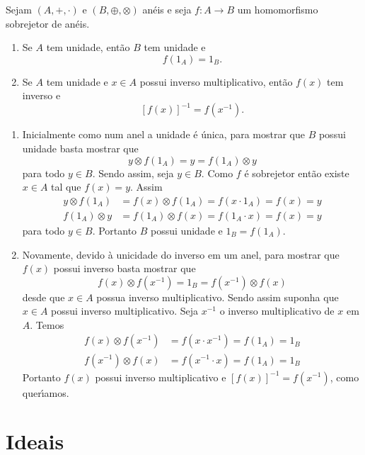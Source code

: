 \begin{proposicao}
	Sejam $(A, +, \cdot)$ e $(B, \oplus, \otimes)$ an\'eis e seja $f : A \to B$ um homomorfismo sobrejetor de an\'eis.
	\begin{enumerate}[label={\roman*})]
		\item Se $A$ tem unidade, ent\~ao $B$ tem unidade e
		\[
			f(1_A) = 1_B.
		\]
		\item Se $A$ tem unidade e $x \in A$ possui inverso multiplicativo, ent\~ao $f(x)$ tem inverso e
		\[
			[f(x)]^{-1} = f(x^{-1}).
		\]
	\end{enumerate}
\end{proposicao}
\begin{prova}
	\begin{enumerate}[label={\roman*})]
		\item Inicialmente como num anel a unidade \'e \'unica, para mostrar que $B$ possui unidade basta mostrar que
		\[
			y\otimes f(1_A) = y = f(1_A)\otimes y
		\]
		para todo $y \in B$. Sendo assim, seja $y \in B$. Como $f$ \'e sobrejetor ent\~ao existe $x \in A$ tal que $f(x) = y$. Assim
		\begin{align*}
			y\otimes f(1_A) &= f(x) \otimes f(1_A) = f(x\cdot 1_A) = f(x) = y\\
			f(1_A)\otimes y &= f(1_A) \otimes f(x) = f(1_A\cdot x) = f(x) = y
		\end{align*}
		para todo $y \in B$. Portanto $B$ possui unidade e $1_B = f(1_A)$.

		\item Novamente, devido \`a unicidade do inverso em um anel, para mostrar que $f(x)$ possui inverso basta mostrar que
		\[
			f(x)\otimes f(x^{-1}) = 1_B = f(x^{-1})\otimes f(x)
		\]
		desde que $x \in A$ possua inverso multiplicativo. Sendo assim suponha que $x \in A$ possui inverso multiplicativo. Seja $x^{-1}$ o inverso multiplicativo de $x$ em $A$. Temos
		\begin{align*}
			f(x)\otimes f(x^{-1}) &= f(x\cdot x^{-1}) = f(1_A) = 1_B\\
			f(x^{-1})\otimes f(x) &= f(x^{-1}\cdot x) = f(1_A) = 1_B
		\end{align*}
		Portanto $f(x)$ possui inverso multiplicativo e $[f(x)]^{-1} = f(x^{-1})$, como quer{\'\i}amos.
	\end{enumerate}
\end{prova}

\section{Ideais} %
\label{sec:ideais}

